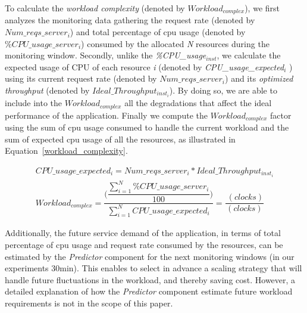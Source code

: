 To calculate the \emph{workload complexity} (denoted by \emph{$Workload_{complex}$}), we first analyzes the monitoring data gathering the request rate (denoted by $Num\_reqs\_server_{i}$) and total percentage of cpu usage (denoted by \emph{$\%CPU\_usage\_server_{i}$}) consumed by the allocated \emph{N} resources during the monitoring window. Secondly, unlike the \emph{\%CPU\_usage$_{inst}$},  we calculate the expected usage of CPU of each resource \emph{i} (denoted by \emph{CPU\_usage\_expected$_{i}$} ) using its current request rate (denoted by $Num\_reqs\_server_{i}$) and its \emph{optimized throughput} (denoted by $Ideal\_Throughput_{inst_{i}}$). By doing so, we are able to include into the \emph{$Workload_{complex}$} all the degradations that affect the ideal performance of the application. Finally we compute the \emph{$Workload_{complex}$} factor using the sum of cpu usage consumed to handle the current workload and the sum of expected cpu usage of all the resources, as illustrated in Equation~\ref{workload_complexity}.



{\scriptsize
\begin{equation}\label{workload_complexity}
\begin{split}
CPU\_usage\_expected_{i} =  Num\_reqs\_server_{i}  * Ideal\_Throughput_{inst_{i}} \\
Workload_{complex}  = \dfrac{ \bigg(  \dfrac{ \sum_{i=1}^N \%CPU\_usage\_server_{i} } {100} \bigg) }  {  \sum_{i=1}^N  CPU\_usage\_expected_{i}     } = \dfrac{ \ (clocks) }  {  (clocks) }
\end{split}
\end{equation}
}

Additionally, the future service demand of the application, in terms of total percentage of cpu usage and request rate consumed by the resources, can be estimated by the \emph{Predictor} component for the next monitoring windows (in our experiments 30min). This enables to select in advance a scaling strategy that will handle future fluctuations in the workload, and thereby saving cost. However, a detailed explanation of how the \emph{Predictor} component estimate future workload requirements is not in the scope of this paper.

